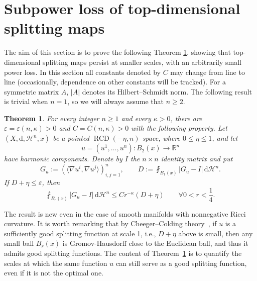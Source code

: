 \documentclass[12pt,a4paper,reqno]{amsart}
\newtheorem{theorem}{Theorem}[section]
\renewcommand{\leq}{\leqslant}
\renewcommand{\geq}{\geqslant}
\newcommand{\R}{\mathbb R}
\renewcommand{\d}{\ensuremath{\mathrm d}}
\newcommand{\Hn}{\mathcal H^n}
\begin{document}
\section{Subpower loss of top-dimensional splitting maps}\label{sec:gram-defect}
The aim of this section is to prove the following Theorem \ref{thm:main}, showing that top-dimensional splitting maps persist at smaller scales, with an arbitrarily small power loss. 
In this section all constants denoted by $C$ may change from line to line (occasionally,
dependence on other constants will be tracked). For a symmetric matrix $A$, $|A|$ denotes its Hilbert--Schmidt norm. The following result is trivial when $n=1$, so we will always assume that $n\geq 2$. 

\begin{theorem}\label{thm:main}
For every integer $n\geq 1$ and every $\kappa>0$, there are $
 \varepsilon=\varepsilon(n,\kappa)>0$ and $
 C=C(n,\kappa)>0$
with the following property. Let $(X,\d,\Hn,x)$ be a pointed
$\operatorname{RCD}(-\eta,n)$ space, where $0\leq\eta\leq1$, and let
\[
 u=(u^1,\ldots,u^n):B_2(x)\to \R^n
\]
have harmonic components. Denote by $I$ the $n\times n$ identity matrix and put
\begin{equation}\label{eq:Gudefn}
 G_u:=\left(\langle\nabla u^i,\nabla u^j\rangle\right)_{i,j=1}^n,
 \qquad
 D:=\fint_{B_1(x)}|G_u-I|\,\mathrm{d}\Hn.
\end{equation}
If $D+\eta\leq \varepsilon$, then
\begin{equation}\label{eq:main-matrix}
 \fint_{B_r(x)}|G_u-I|\,\mathrm{d}\Hn
 \leq Cr^{-\kappa}(D+\eta)
 \qquad\forall 0<r<\frac14.
\end{equation}
\end{theorem}

The result is new even in the case of smooth manifolds with nonnegative Ricci curvature. It is worth remarking that by Cheeger--Colding theory~\cite{ChCo0}, if $u$ is a sufficiently good splitting function at scale 1, i.e., $D+\eta$ above is small, then any small ball $B_r(x)$ is Gromov-Hausdorff close to the Euclidean ball, and thus it admits good splitting functions. The content of Theorem~\ref{thm:main} is to quantify the scales at which the same function $u$ can still serve as a good splitting function, even if it is not the optimal one. 
\smallskip 
\end{document}
